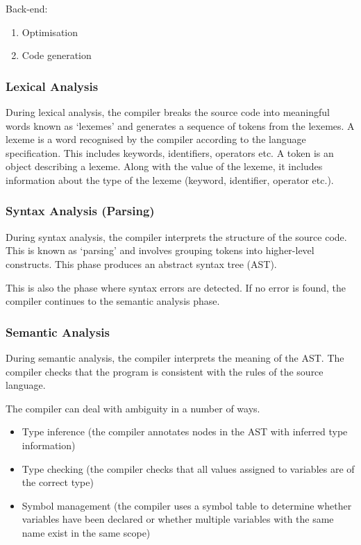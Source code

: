 Back-end:
\begin{enumerate}[resume]
  \item Optimisation
  \item Code generation
\end{enumerate}

\subsubsection{Lexical Analysis}

During lexical analysis, the compiler breaks the source code into meaningful words known as `lexemes' and generates a sequence of tokens from the lexemes.
A lexeme is a word recognised by the compiler according to the language specification.
This includes keywords, identifiers, operators etc.
A token is an object describing a lexeme.
Along with the value of the lexeme, it includes information about the type of the lexeme (keyword, identifier, operator etc.).

\subsubsection{Syntax Analysis (Parsing)}

During syntax analysis, the compiler interprets the structure of the source code.
This is known as `parsing' and involves grouping tokens into higher-level constructs.
This phase produces an abstract syntax tree (AST).

This is also the phase where syntax errors are detected.
If no error is found, the compiler continues to the semantic analysis phase.

\subsubsection{Semantic Analysis}

During semantic analysis, the compiler interprets the meaning of the AST.\@
The compiler checks that the program is consistent with the rules of the source language.

The compiler can deal with ambiguity in a number of ways.

\begin{itemize}
  \item Type inference (the compiler annotates nodes in the AST with inferred type information)
  \item Type checking (the compiler checks that all values assigned to variables are of the correct type)
  \item Symbol management (the compiler uses a symbol table to determine whether variables have been declared or whether multiple variables with the same name exist in the same scope)
\end{itemize}

